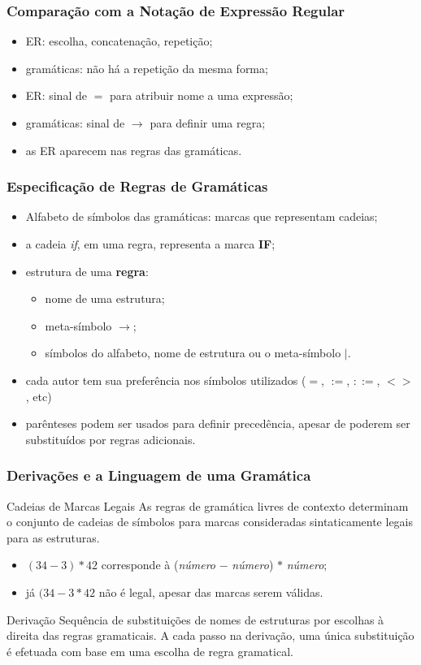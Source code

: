\documentclass[table]{beamer}
\begin{document}
\begin{frame}
   \frametitle{Comparação com a Notação de Expressão Regular}
   \begin{itemize}
      \item ER: escolha, concatenação, repetição;
      \item gramáticas: não há a repetição da mesma forma;
      \item ER: sinal de $=$ para atribuir nome a uma expressão;
      \item gramáticas: sinal de $\to$ para definir uma regra;
      \item as ER aparecem nas regras das gramáticas.   
   \end{itemize}
\end{frame}

\begin{frame}
   \frametitle{Especificação de Regras de Gramáticas}
   \begin{itemize}
      \item Alfabeto de símbolos das gramáticas: marcas que representam cadeias;
      \item a cadeia \textit{if}, em uma regra, representa a marca \textbf{IF};
      \item estrutura de uma \textbf{regra}:
      \begin{itemize}
         \item nome de uma estrutura;
	 \item meta-símbolo $\to$;
	 \item símbolos do alfabeto, nome de estrutura ou o meta-símbolo $|$.
      \end{itemize}
      \item cada autor tem sua preferência nos símbolos utilizados ($=$, $:=$, $::=$, $<>$, etc) 
      \item parênteses podem ser usados para definir precedência, apesar de poderem ser substituídos por regras adicionais.
   \end{itemize}
\end{frame}

\begin{frame}
   \frametitle{Derivações e a Linguagem de uma Gramática}
   \begin{block}{Cadeias de Marcas Legais}
   As regras de gramática livres de contexto determinam o conjunto de cadeias de símbolos para marcas consideradas sintaticamente legais para as estruturas.
   \begin{itemize}
      \item $(34 - 3) * 42$ corresponde à (\textit{número} $-$ \textit{número}) $*$ \textit{número};
      \item já $(34 - 3 * 42$ não é legal, apesar das marcas serem válidas. 
   \end{itemize}
   \end{block}
   \begin{block}{Derivação}
   Sequência de substituições de nomes de estruturas por escolhas à direita das regras gramaticais. A cada passo na derivação, uma única substituição é efetuada com base em uma escolha de regra gramatical.
   \end{block}
\end{frame}
\end{document}
